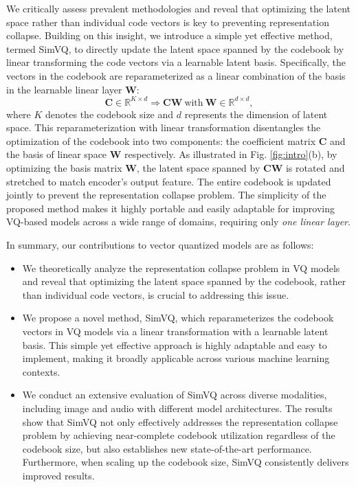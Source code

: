 We critically assess prevalent methodologies and reveal that optimizing the latent space rather than individual code vectors is key to preventing representation collapse. Building on this insight, we introduce a simple yet effective method, termed SimVQ, to directly update the latent space spanned by the codebook by linear transforming the code vectors via a learnable latent basis. Specifically, the vectors in the codebook are reparameterized as a linear combination of the basis in the learnable linear layer $\bm{W}$:
\begin{equation}
    \bm{C} \in \mathbb{R}^{K\times d} \Rightarrow \bm{CW} ~\text{with}~ \bm{W} \in \mathbb{R}^{d\times d},
\end{equation}
where $K$ denotes the codebook size and $d$ represents the dimension of latent space. This reparameterization with linear transformation disentangles the optimization of the codebook into two components: the coefficient matrix $\bm{C}$ and the basis of linear space $\bm{W}$ respectively. As illustrated in Fig. \ref{fig:intro}(b), by optimizing the basis matrix $\bm{W}$, the latent space spanned by $\bm{CW}$ is rotated and stretched to match encoder's output feature. The entire codebook is updated jointly to prevent the representation collapse problem. The simplicity of the proposed method makes it highly portable and easily adaptable for improving VQ-based models across a wide range of domains, requiring only \textit{one linear layer}.


In summary, our contributions to vector quantized models are as follows:
\begin{itemize}
    \item We theoretically analyze the representation collapse problem in VQ models and reveal that optimizing the latent space spanned by the codebook, rather than individual code vectors, is crucial to addressing this issue. 
    \item We propose a novel method, SimVQ, which reparameterizes the codebook vectors in VQ models via a linear transformation with a learnable latent basis. This simple yet effective approach is highly adaptable and easy to implement, making it broadly applicable across various machine learning contexts.
    \item We conduct an extensive evaluation of SimVQ across diverse modalities, including image and audio with different model architectures. The results show that SimVQ not only effectively addresses the representation collapse problem by achieving near-complete codebook utilization regardless of the codebook size, but also establishes new state-of-the-art performance. Furthermore, when scaling up the codebook size, SimVQ consistently delivers improved results.
\end{itemize}
